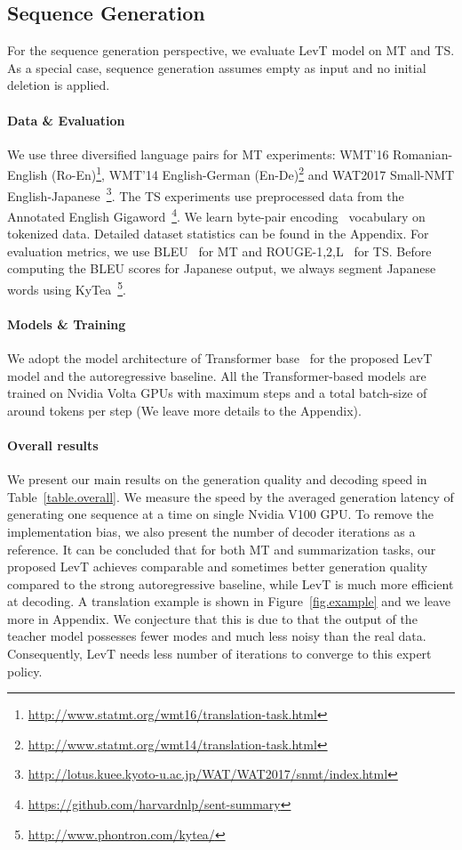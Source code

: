 \documentclass{article}
\begin{document}
\subsection{Sequence Generation}
\label{sec.gen}
For the sequence generation perspective, we evaluate LevT model on MT and TS. As a special case, sequence generation assumes empty  as input and no initial deletion is applied. 

\paragraph{Data \& Evaluation} 
We use three diversified language pairs for MT experiments: WMT'16 Romanian-English (Ro-En)\footnote{\url{http://www.statmt.org/wmt16/translation-task.html}}, WMT'14 English-German (En-De)\footnote{\url{http://www.statmt.org/wmt14/translation-task.html}} and WAT2017 Small-NMT English-Japanese~\citep[En-Ja,][]{nakazawa-etal-2017-overview}\footnote{\url{http://lotus.kuee.kyoto-u.ac.jp/WAT/WAT2017/snmt/index.html}}. The TS experiments use preprocessed data from the Annotated English Gigaword~\citep[Gigaword,][]{rush2015neural}\footnote{\url{https://github.com/harvardnlp/sent-summary}}. 
We learn byte-pair encoding~\citep[BPE,][]{sennrich2015neural} vocabulary on tokenized data.
Detailed dataset statistics can be found in the Appendix. For evaluation metrics, we use BLEU~\citep{papineni2002bleu} for MT and ROUGE-1,2,L~\citep{lin:2004:ACLsummarization} for TS. Before computing the BLEU scores for Japanese output, we always segment Japanese words using KyTea~\footnote{\url{http://www.phontron.com/kytea/}}.

\paragraph{Models \& Training} We adopt the model architecture of Transformer base~\citep{vaswani2017attention} for the proposed LevT model and the autoregressive baseline. 
All the Transformer-based models are trained on  Nvidia Volta GPUs with maximum  steps and a total batch-size of around  tokens per step (We leave more details to the Appendix).


\paragraph{Overall results} 
We present our main results on the generation quality and decoding speed in Table~\ref{table.overall}. We measure the speed by the averaged generation latency of generating one sequence at a time on single Nvidia V100 GPU. To remove the implementation bias, we also present the number of decoder iterations as a reference. It can be concluded that for both MT and summarization tasks, our proposed LevT achieves comparable and sometimes better generation quality compared to the strong autoregressive baseline, while LevT is much more efficient at decoding. A translation example is shown in Figure~\ref{fig.example} and we leave more in Appendix.
We conjecture that this is due to that the output of the teacher model possesses fewer modes and much less noisy than the real data. Consequently, LevT needs less number of iterations to converge to this expert policy.
\end{document}

